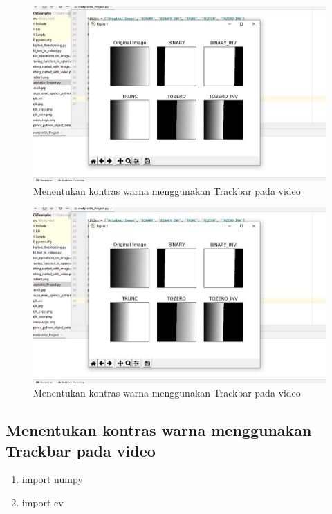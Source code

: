 \newpage
\begin{figure}[ht]
\centering
\includegraphics[scale=0.5]{figures/2,49.jpg}
\caption{Menentukan kontras warna menggunakan Trackbar pada video}
\label{contoh}
\end{figure}

\newpage
\begin{figure}[ht]
\centering
\includegraphics[scale=0.5]{figures/2,49.jpg}
\caption{Menentukan kontras warna menggunakan Trackbar pada video}
\label{contoh}
\end{figure}






\newpage
\subsection{Menentukan kontras warna menggunakan Trackbar pada video}

\begin{enumerate}
	\item import numpy
	\item import cv
\end{enumerate}

